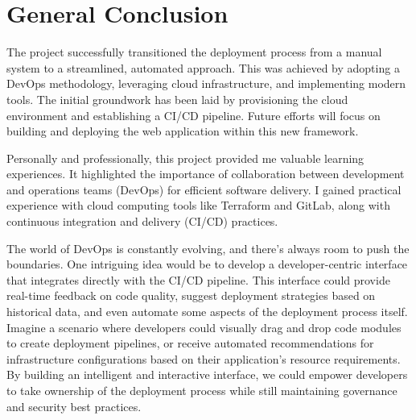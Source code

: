 \chapter*{General Conclusion}
The project successfully transitioned the deployment process from a manual system to a streamlined, automated approach. This was achieved by adopting a DevOps methodology, leveraging cloud infrastructure, and implementing modern tools. The initial groundwork has been laid by provisioning the cloud environment and establishing a CI/CD pipeline.  Future efforts will focus on building and deploying the web application within this new framework.
\par
Personally and professionally, this project provided me valuable learning experiences. It highlighted the importance of collaboration between development and operations teams (DevOps)  for efficient software delivery.  I gained practical experience with cloud computing tools like Terraform and GitLab, along with continuous integration and delivery (CI/CD) practices.
\par
The world of DevOps is constantly evolving, and there's always room to push the boundaries.  One intriguing idea would be to develop a developer-centric interface that integrates directly with the CI/CD pipeline. This interface could provide real-time feedback on code quality, suggest deployment strategies based on historical data, and even automate some aspects of the deployment process itself.  Imagine a scenario where developers could visually drag and drop code modules to create deployment pipelines, or receive automated recommendations for infrastructure configurations based on their application's resource requirements. By building an intelligent and interactive interface, we could empower developers to take ownership of the deployment process while still maintaining governance and security best practices.
